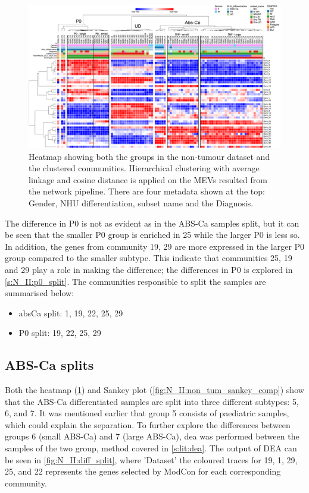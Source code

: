 \begin{figure}
    \includegraphics[width=1.0\textwidth,height=1.0\textheight,keepaspectratio]{Sections/Network_II/resources/non_tum/norm_healthy_std_3.1.png}
    \caption[Heatmap of the new healthy dataset subtypes]{Heatmap showing both the groups in the non-tumour dataset and the clustered communities. Hierarchical clustering with average linkage and cosine distance is applied on the MEVs resulted from the network pipeline. There are four metadata shown at the top: Gender, NHU differentiation, subset name and the Diagnosis. }
    \label{fig:N_II:morph_non_tum}
\end{figure}


The difference in P0 is not as evident as in the ABS-Ca samples split, but it can be seen that the smaller P0 group is enriched in 25 while the larger P0 is less so. In addition, the genes from community 19, 29 are more expressed in the larger P0 group compared to the smaller subtype. This indicate that communities 25, 19 and 29 play a role in making the difference; the differences in P0 is explored in \cref{s:N_II:p0_split}. The communities responsible to split the samples are summarised below:
\begin{itemize}
    \item \acrshort{absCa} split: 1, 19, 22, 25, 29
    \item P0 split: 19, 22, 25, 29
\end{itemize}

\subsection{ABS-Ca splits} \label{s:N_II:diff_split}

Both the heatmap (\cref{fig:N_II:morph_non_tum}) and Sankey plot (\cref{fig:N_II:non_tum_sankey_comp}) show that the ABS-Ca differentiated samples are split into three different subtypes: 5, 6, and 7. It was mentioned earlier that group 5 consists of paediatric samples, which could explain the separation. To further explore the differences between groups 6 (small ABS-Ca) and 7 (large ABS-Ca), \acrlong{dea} was performed between the samples of the two group, method covered in \cref{s:lit:dea}. The output of DEA can be seen in \cref{fig:N_II:diff_split}, where 'Dataset' the coloured traces for 19, 1, 29, 25, and 22 represents the genes selected by ModCon for each corresponding community.

